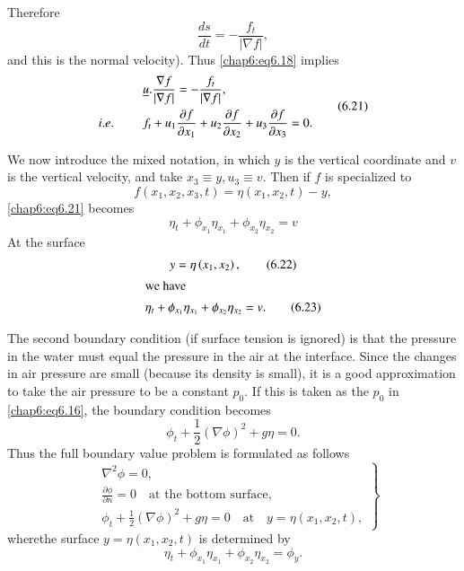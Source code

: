 Therefore
$$
\frac{ds}{dt}=-\frac{f_t}{|\nabla f|},
$$
and this is the normal velocity). Thus \eqref{chap6:eq6.18} implies
\begin{equation}
\begin{aligned}
& \underline{u}.\frac{\nabla f}{|\nabla f|}=-\frac{f_t}{|\nabla f|},\\
{i.e.}\kern.3em\qquad & f_t+u_1\frac{\partial f}{\partial x_1}+u_2\frac{\partial f}{\partial x_2}+u_3\frac{\partial f}{\partial x_3}=0. 
\end{aligned}\tag{6.21}\label{chap6:eq6.21}
\end{equation}\pageoriginale

We now introduce the mixed notation, in which $y$ is the vertical coordinate and $v$ is the vertical velocity, and take $x_3\equiv y,u_3\equiv v$. Then if $f$ is specialized to 
$$
f\left(x_1,x_2,x_3,t\right)=\eta\left(x_1,x_2,t\right)-y,
$$
\eqref{chap6:eq6.21} becomes 
$$
\eta_t+\phi_{x_1}\eta_{x_1}+\phi_{x_2}\eta_{x_2}=v
$$
At the surface
\begin{gather}
y=\eta\left(x_1,x_2\right),\tag{6.22}\label{chap6:eq6.22}\\
\intertext{we have}
\eta_t+\phi_{x_1}\eta_{x_1}+\phi_{x_2}\eta_{x_2}=v.\tag{6.23}\label{chap6:eq6.23}
\end{gather}

The second boundary condition (if surface tension is ignored) is that the pressure in the water must equal the pressure in the air at the interface. Since the changes in air pressure are small (because its density is small), it is a good approximation to take the air pressure to be a constant $p_0$. If this is taken as the $p_0$ in \eqref{chap6:eq6.16}, the boundary condition becomes
$$
\phi_t+\frac{1}{2}(\nabla\phi)^2+g\eta =0.
$$
Thus the full boundary value problem is formulated as follows 
\begin{equation}
\left.
\begin{aligned}
& \nabla^2\phi=0,\\
&\frac{\partial\phi}{\partial n}=0\quad\text{at the bottom surface},\\
&\phi_t+\frac{1}{2}(\nabla\phi)^2+g\eta=0\quad\text{at}\quad y=\eta\left(x_1, x_2,t\right),
\end{aligned}
\right\}\tag{6.24}\label{chap6:eq6.24}
\end{equation}
where\pageoriginale the surface $y=\eta(x_1,x_2,t)$ is determined by
\begin{equation}
\eta_t+\phi_{x_1}\eta_{x_1}+\phi_{x_2}\eta_{x_2}=\phi_y. \tag{6.25}\label{chap6:eq6.25}
\end{equation}

